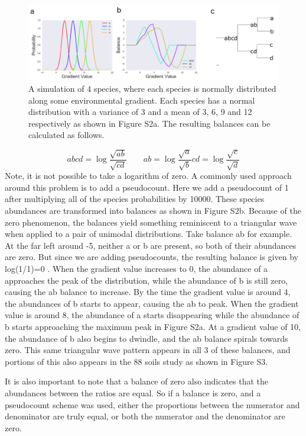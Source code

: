 \begin{figure}[H]
        \centering
        \includegraphics[width=1\textwidth]{appendix_b/sup_figure2.png}
        \caption[An ecological intrepretation of balances]{A simulation of 4 species, where each species is normally distributed along some environmental gradient.  Each species has a normal distribution with a variance of 3 and a mean of 3, 6, 9 and 12 respectively as shown in Figure S2a.  The resulting balances can be calculated as follows.}
        \label{figbS2}
\end{figure}
\[
abcd = \log \frac{\sqrt{ab}}{\sqrt{cd}} \qquad
ab = \log \frac{\sqrt{a}}{\sqrt{b}}
cd = \log \frac{\sqrt{c}}{\sqrt{d}}
\]
Note, it is not possible to take a logarithm of zero.  A commonly used approach around this problem is to add a pseudocount.  Here we add a pseudocount of 1 after multiplying all of the species probabilities by 10000.  These species abundances are transformed into balances as shown in Figure S2b.  Because of the zero phenomenon, the balances yield something reminiscent to a triangular wave when applied to a pair of unimodal distributions.  Take balance ab for example.  At the far left around -5, neither a or b are present, so both of their abundances are zero.  But since we are adding pseudocounts, the resulting balance is given by log(1/1)=0 . When the gradient value increases to 0, the abundance of a approaches the peak of the distribution, while the abundance of b is still zero, causing the ab balance to increase.  By the time the gradient value is around 4, the abundances of b starts to appear, causing the ab to peak.  When the gradient value is around 8, the abundance of a starts disappearing while the abundance of b starts approaching the maximum peak in Figure S2a.  At a gradient value of 10, the abundance of b also begins to dwindle, and the ab balance spirals towards zero.  This same triangular wave pattern appears in all 3 of these balances, and portions of this also appears in the 88 soils study as shown in Figure S3.

It is also important to note that a balance of zero also indicates that the abundances between the ratios are equal.  So if a balance is zero, and a pseudocount scheme was used, either the proportions between the numerator and denominator are truly equal, or both the numerator and the denominator are zero.\newpage
